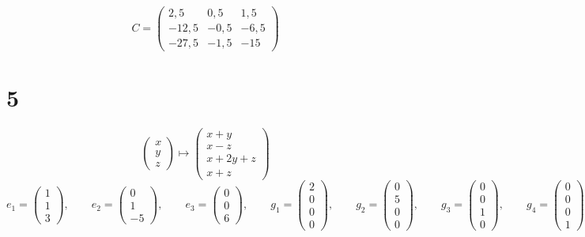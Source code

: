 $$ C =
\begin{pmatrix}
    2,5 & 0,5 & 1,5 \\
    -12,5 & -0,5 & -6,5 \\
    -27,5 & -1,5 & -15
\end{pmatrix} $$

\section{5}

$$
\begin{pmatrix}
	x \\
    y \\
    z
\end{pmatrix} \mapsto
\begin{pmatrix}
	x + y \\
    x - z \\
    x + 2y + z \\
    x + z
\end{pmatrix} $$
$$ e_1 =
\begin{pmatrix}
	1 \\
    1 \\
    3
\end{pmatrix}, \qquad e_2 =
\begin{pmatrix}
	0 \\
    1 \\
    -5
\end{pmatrix}, \qquad e_3 =
\begin{pmatrix}
	0 \\
    0 \\
    6
\end{pmatrix}, \qquad g_1 =
\begin{pmatrix}
	2 \\
    0 \\
    0 \\
    0
\end{pmatrix}, \qquad g_2 =
\begin{pmatrix}
	0 \\
    5 \\
    0 \\
    0
\end{pmatrix}, \qquad g_3 =
\begin{pmatrix}
	0 \\
    0 \\
    1 \\
    0
\end{pmatrix}, \qquad g_4 =
\begin{pmatrix}
	0 \\
    0 \\
    0 \\
    1
\end{pmatrix} $$
